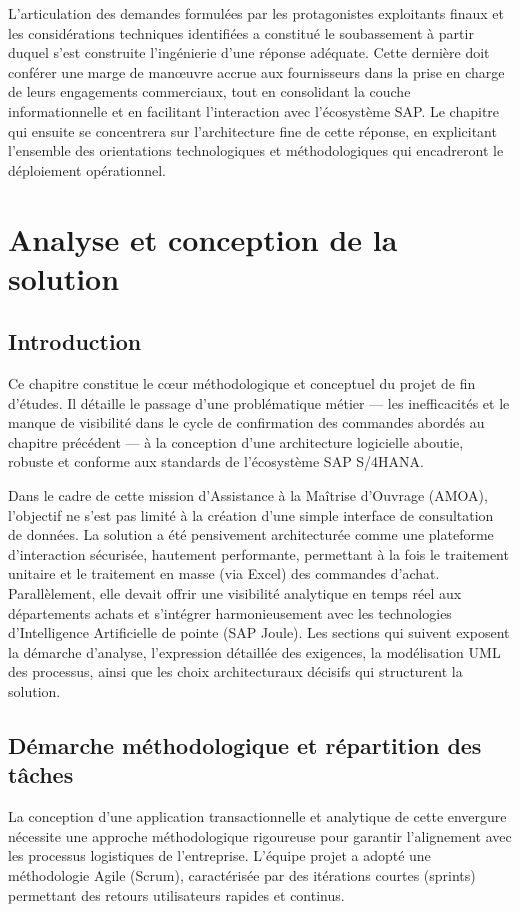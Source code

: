 \documentclass[12pt,a4paper,oneside]{report}
\begin{document}
L'articulation des demandes formulées par les protagonistes exploitants finaux et les considérations techniques identifiées a constitué le soubassement à partir duquel s'est construite l'ingénierie d'une réponse adéquate. Cette dernière doit conférer une marge de manœuvre accrue aux fournisseurs dans la prise en charge de leurs engagements commerciaux, tout en consolidant la couche informationnelle et en facilitant l'interaction avec l'écosystème SAP. Le chapitre qui ensuite se concentrera sur l'architecture fine de cette réponse, en explicitant l'ensemble des orientations technologiques et méthodologiques qui encadreront le déploiement opérationnel.

\chapter{Analyse et conception de la solution}\label{ch:analyse-conception}

\section{Introduction}\label{ch4:introduction}
Ce chapitre constitue le cœur méthodologique et conceptuel du projet de fin d'études. Il détaille le passage d'une problématique métier — les inefficacités et le manque de visibilité dans le cycle de confirmation des commandes abordés au chapitre précédent — à la conception d'une architecture logicielle aboutie, robuste et conforme aux standards de l'écosystème SAP S/4HANA. 

Dans le cadre de cette mission d'Assistance à la Maîtrise d'Ouvrage (AMOA), l'objectif ne s'est pas limité à la création d'une simple interface de consultation de données. La solution a été pensivement architecturée comme une plateforme d'interaction sécurisée, hautement performante, permettant à la fois le traitement unitaire et le traitement en masse (via Excel) des commandes d'achat. Parallèlement, elle devait offrir une visibilité analytique en temps réel aux départements achats et s'intégrer harmonieusement avec les technologies d'Intelligence Artificielle de pointe (SAP Joule). Les sections qui suivent exposent la démarche d'analyse, l'expression détaillée des exigences, la modélisation UML des processus, ainsi que les choix architecturaux décisifs qui structurent la solution.

\section{Démarche méthodologique et répartition des tâches}\label{ch4:demarche}
La conception d'une application transactionnelle et analytique de cette envergure nécessite une approche méthodologique rigoureuse pour garantir l'alignement avec les processus logistiques de l'entreprise. L'équipe projet a adopté une méthodologie Agile (Scrum), caractérisée par des itérations courtes (sprints) permettant des retours utilisateurs rapides et continus.
\end{document}
